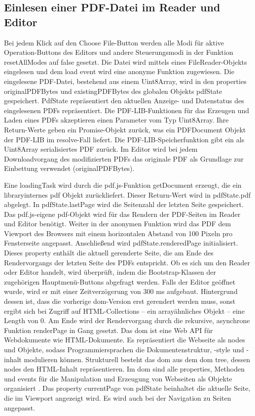 \subsection{Einlesen einer PDF-Datei im Reader und Editor}
Bei jedem Klick auf den Choose File-Button werden alle Modi für aktive Operation-Buttons des Editors und andere Steuerungsmodi in der Funktion resetAllModes auf false gesetzt. Die Datei wird mittels eines FileReader-Objekts eingelesen und dem load event wird eine anonyme Funktion zugewiesen. Die eingelesene PDF-Datei, bestehend aus einem Uint8Array, wird in den properties originalPDFBytes und existingPDFBytes des globalen Objekts pdfState gespeichert. PdfState repräsentiert den aktuellen Anzeige- und Datenstatus des eingelesenen PDFs repräsentiert. Die PDF-LIB-Funktionen für das Erzeugen und Laden eines PDFs akzeptieren einen Parameter vom Typ Uint8Array. Ihre Return-Werte geben ein Promise-Objekt zurück, was ein PDFDocument Objekt der PDF-LIB im resolve-Fall liefert. Die PDF-LIB-Speicherfunktion gibt ein als Uint8Array serialisiertes PDF zurück. Im Editor wird bei jedem Downloadvorgang des modifizierten PDFs das originale PDF als Grundlage zur Einbettung verwendet (originalPDFBytes).
\par
Eine loadingTask wird durch die pdf.js-Funktion getDocument erzeugt, die ein libraryinternes pdf Objekt zurückliefert. Dieser Return-Wert wird in pdfState.pdf abgelegt. In pdfState.lastPage wird die Seitenzahl der letzten Seite gespeichert. Das pdf.js-eigene pdf-Objekt wird für das Rendern der PDF-Seiten im Reader und Editor benötigt. Weiter in der anonymen Funktion wird das PDF dem Viewport des Browsers mit einem horizontalen Abstand von 100 Pixeln pro Fensterseite angepasst. Anschließend wird pdfState.renderedPage initialisiert. Dieses property enthält die aktuell gerenderte Seite, die am Ende des Rendervorgangs der letzten Seite des PDFs entspricht. Ob es sich um den Reader oder Editor handelt, wird überprüft, indem die Bootstrap-Klassen der zugehörigen Hauptmenü-Buttons abgefragt werden. Falls der Editor geöffnet wurde, wird er mit einer Zeitverzögerung von 300 ms aufgebaut. Hintergrund dessen ist, dass die vorherige \gls{dom}-Version erst gerendert werden muss, sonst ergibt sich bei Zugriff auf HTML-Collections – ein arrayähnliches Objekt – eine Length von 0. Am Ende wird der Rendervorgang durch die rekursive, asynchrone Funktion renderPage in Gang gesetzt. Das \gls{dom} ist eine Web API für Webdokumente wie HTML-Dokumente. Es repräsentiert die Webseite als nodes und Objekte, sodass Programmiersprachen die Dokumentenstruktur, -style und -inhalt modulieren können. Strukturell besteht das \gls{dom} aus dem \gls{dom} tree, dessen nodes den HTML-Inhalt repräsentieren. Im \gls{dom} sind alle properties, Methoden und events für die Manipulation und Erzeugung von Webseiten als Objekte organisiert \cite{mozilla-dom}. Das property currentPage von pdfState beinhaltet die aktuelle Seite, die im Viewport angezeigt wird. Es wird auch bei der Navigation zu Seiten angepasst.

